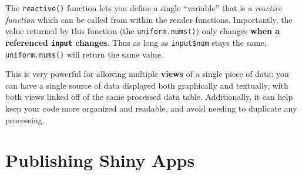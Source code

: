 \documentclass[]{book}
\newenvironment{Shaded}{\begin{snugshade}}{\end{snugshade}}
\newcommand{\KeywordTok}[1]{\textcolor[rgb]{0.13,0.29,0.53}{\textbf{#1}}}
\newcommand{\DataTypeTok}[1]{\textcolor[rgb]{0.13,0.29,0.53}{#1}}
\newcommand{\DecValTok}[1]{\textcolor[rgb]{0.00,0.00,0.81}{#1}}
\newcommand{\StringTok}[1]{\textcolor[rgb]{0.31,0.60,0.02}{#1}}
\newcommand{\CommentTok}[1]{\textcolor[rgb]{0.56,0.35,0.01}{\textit{#1}}}
\newcommand{\ControlFlowTok}[1]{\textcolor[rgb]{0.13,0.29,0.53}{\textbf{#1}}}
\newcommand{\OperatorTok}[1]{\textcolor[rgb]{0.81,0.36,0.00}{\textbf{#1}}}
\newcommand{\NormalTok}[1]{#1}
\theoremstyle{definition}
\theoremstyle{definition}
\theoremstyle{remark}
\begin{document}
\begin{Shaded}
\end{Shaded}

The \texttt{reactive()} function lets you define a single ``variable''
that is a \emph{reactive function} which can be called from within the
render functions. Importantly, the value returned by this function (the
\texttt{uniform.nums()}) only changes \textbf{when a referenced
\texttt{input} changes}. Thus as long as \texttt{input\$num} stays the
same, \texttt{uniform.nums()} will return the same value.

This is very powerful for allowing multiple \textbf{views} of a single
piece of data: you can have a single source of data displayed both
graphically and textually, with both views linked off of the same
processed data table. Additionally, it can help keep your code more
organized and readable, and avoid needing to duplicate any processing.

\section{Publishing Shiny Apps}\label{publishing-shiny-apps}
\end{document}
